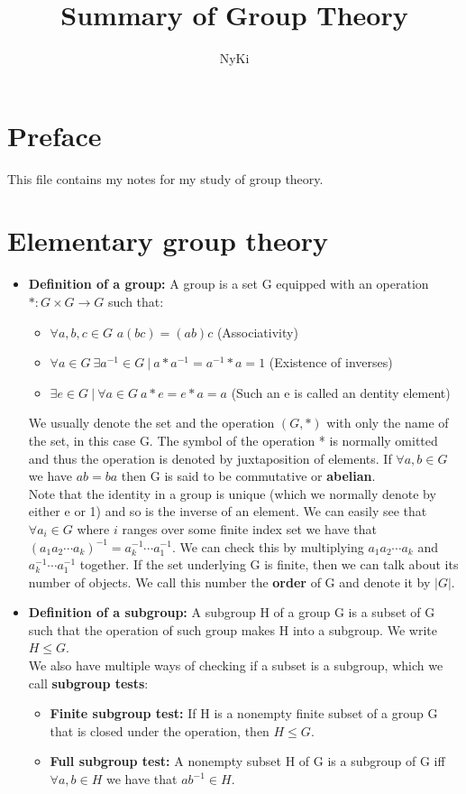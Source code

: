 \documentclass[a4paper]{article}
\author{NyKi}
\title{Summary of Group Theory}
\begin{document}
\maketitle
\tableofcontents
\section{Preface}
This file contains my notes for my study of group theory.

\section{Elementary group theory}

\begin{itemize}

\item
\textbf{Definition of a group:} A group is a set G equipped with an operation $*: G \times G \rightarrow G$ such that:
\begin{itemize}
\item
$\forall a,b,c \in G$  $a(bc) = (ab)c$ (Associativity)
\item
$\forall a \in G\ \exists a^{-1} \in G \ |\ a*a^{-1} = a^{-1}*a = 1$ (Existence of inverses)
\item
$\exists e \in G\ |\ \forall a \in G\ a*e=e*a=a$ (Such an e is called an dentity element)
\end{itemize}

We usually denote the set and the operation $(G,*)$ with only the name of the set, in this case G. The symbol of the operation * is normally omitted and thus the operation is denoted by juxtaposition of elements. If $\forall a,b \in G$ we have $ab=ba$ then G is said to be commutative or \textbf{abelian}.\\
Note that the identity in a group is unique (which we normally denote by either e or 1) and so is the inverse of an element. We can easily see that $\forall a_{i} \in G$ where $i$ ranges over some finite index set we have that $(a_{1}a_{2}\cdots a_{k})^{-1} = a_{k}^{-1}\cdots a_{1}^{-1}$. We can check this by multiplying $a_{1}a_{2}\cdots a_{k}$ and $a_{k}^{-1}\cdots a_{1}^{-1}$ together. If the set underlying G is finite, then we can talk about its number of objects. We call this number the \textbf{order} of G and denote it by $|G|$.

\item
\textbf{Definition of a subgroup: } A subgroup H of a group G is a subset of G such that the operation of such group makes H into a subgroup. We write $H\leq G$.\\
We also have multiple ways of checking if a subset is a subgroup, which we call \textbf{subgroup tests}:
\begin{itemize}
\item
\textbf{Finite subgroup test: }If H is a nonempty finite subset of a group G that is closed under the operation, then $H\leq G$.
\item
\textbf{Full subgroup test: }A nonempty subset H of G is a subgroup of G iff $\forall a,b \in H$ we have that $ab^{-1} \in H$.
\end{itemize}


\end{itemize}
\end{document}
